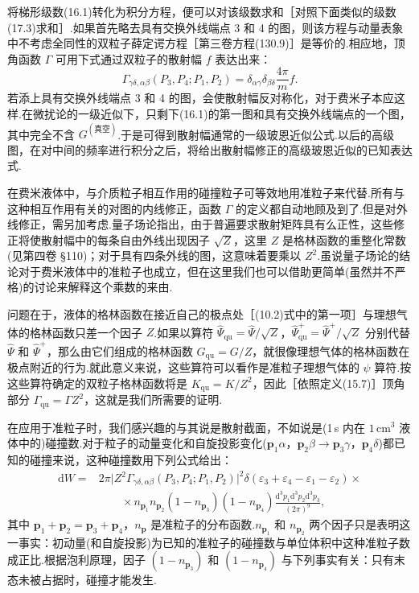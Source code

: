 将梯形级数(16.1)转化为积分方程，便可以对该级数求和［对照下面类似的级数(17.3)求和］.如果首先略去具有交换外线端点 3 和 4 的图，则该方程与动量表象中不考虑全同性的双粒子薛定谔方程［第三卷方程(130.9)］是等价的.相应地，顶角函数 $\Gamma$ 可用下式通过双粒子的散射幅 $f$ 表达出来：
\begin{equation}
  \Gamma_{\gamma\delta,\alpha\beta}(P_3,P_4;P_1,P_2)=\delta_{\alpha\gamma}\delta_{\beta\delta}\frac{4\pi}{m}f.
\end{equation}
若添上具有交换外线端点 3 和 4 的图，会使散射幅反对称化，对于费米子本应这样.在微扰论的一级近似下，只剩下(16.1)的第一图和具有交换外线端点的一个图，其中完全不含 $G^{(\text{真空})}$.于是可得到散射幅通常的一级玻恩近似公式.以后的高级图，在对中间的频率进行积分之后，将给出散射幅修正的高级玻恩近似的已知表达式.

在费米液体中，与介质粒子相互作用的碰撞粒子可等效地用准粒子来代替.所有与这种相互作用有关的对图的内线修正，函数 $\Gamma$ 的定义都自动地顾及到了.但是对外线修正，需另加考虑.量子场论指出，由于普遍要求散射矩阵具有么正性，这些修正将使散射幅中的每条自由外线出现因子 $\sqrt{Z}$，这里 $Z$ 是格林函数的重整化常数(见第四卷 §110)；对于具有四条外线的图，这意味着要乘以 $Z^2$.虽说量子场论的结论对于费米液体中的准粒子也成立，但在这里我们也可以借助更简单(虽然并不严格)的讨论来解释这个乘数的来由.

问题在于，液体的格林函数在接近自己的极点处［(10.2)式中的第一项］与理想气体的格林函数只差一个因子 $Z$.如果以算符 $\hat{\Psi}_{\mathrm{qu}}=\hat{\Psi}/\sqrt{Z}$，$\hat{\Psi}^{+}_{\mathrm{qu}}=\hat{\Psi}^{+}/\sqrt{Z}$ 分别代替 $\hat{\Psi}$ 和 $\hat{\Psi}^{+}$，那么由它们组成的格林函数 $G_{\mathrm{qu}}=G/Z$，就很像理想气体的格林函数在极点附近的行为.就此意义来说，这些算符可以看作是准粒子理想气体的 $\psi$ 算符.按这些算符确定的双粒子格林函数将是 $K_{\mathrm{qu}}=K/Z^2$，因此［依照定义(15.7)］顶角部分 $\Gamma_{\mathrm{qu}}=\Gamma Z^2$，这就是我们所需要的证明.

在应用于准粒子时，我们感兴趣的与其说是散射截面，不如说是(1\,s 内在 $1\,\mathrm{cm}^3$ 液体中的)碰撞数.对于粒子的动量变化和自旋投影变化($\bm{p}_1\alpha$，$\bm{p}_2\beta\to\bm{p}_3\gamma$，$\bm{p}_4\delta$)都已知的碰撞来说，这种碰撞数用下列公式给出：
\begin{equation}
\begin{aligned}
  \mathrm{d}W={}&2\pi\bigl|Z^2\Gamma_{\gamma\delta,\alpha\beta}(P_3,P_4;P_1,P_2)\bigr|^2\delta(\varepsilon_3+\varepsilon_4-\varepsilon_1-\varepsilon_2)\times\\
  &\qquad\times n_{\bm{p}_1}n_{\bm{p}_2}(1-n_{\bm{p}_3})(1-n_{\bm{p}_4})\frac{\mathrm{d}^3p_1\mathrm{d}^3p_2\mathrm{d}^3p_3}{(2\pi)^9},
\end{aligned}
\end{equation}
其中 $\bm{p}_1+\bm{p}_2=\bm{p}_3+\bm{p}_4$，$n_{\bm{p}}$ 是准粒子的分布函数.$n_{\bm{p}_1}$ 和 $n_{\bm{p}_2}$ 两个因子只是表明这一事实：初动量(和自旋投影)为已知的准粒子的碰撞数与单位体积中这种准粒子数成正比.根据泡利原理，因子 $(1-n_{\bm{p}_3})$ 和 $(1-n_{\bm{p}_4})$ 与下列事实有关：只有末态未被占据时，碰撞才能发生.

